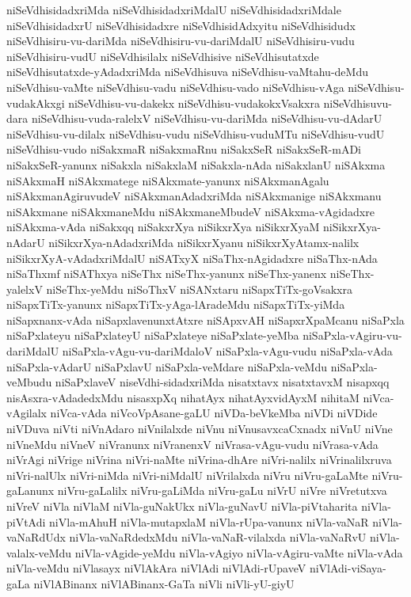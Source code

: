 {niSeVdhisidadxriMda
niSeVdhisidadxriMdalU
niSeVdhisidadxriMdale
niSeVdhisidadxrU
niSeVdhisidadxre
niSeVdhisidAdxyitu
niSeVdhisidudx
niSeVdhisiru-vu-dariMda
niSeVdhisiru-vu-dariMdalU
niSeVdhisiru-vudu
niSeVdhisiru-vudU
niSeVdhisilalx
niSeVdhisive
niSeVdhisutatxde
niSeVdhisutatxde-yAdadxriMda
niSeVdhisuva
niSeVdhisu-vaMtahu-deMdu
niSeVdhisu-vaMte
niSeVdhisu-vadu
niSeVdhisu-vado
niSeVdhisu-vAga
niSeVdhisu-vudakAkxgi
niSeVdhisu-vu-dakekx
niSeVdhisu-vudakokxVsakxra
niSeVdhisuvu-dara
niSeVdhisu-vuda-ralelxV
niSeVdhisu-vu-dariMda
niSeVdhisu-vu-dAdarU
niSeVdhisu-vu-dilalx
niSeVdhisu-vudu
niSeVdhisu-vuduMTu
niSeVdhisu-vudU
niSeVdhisu-vudo
niSakxmaR
niSakxmaRnu
niSakxSeR
niSakxSeR-mADi
niSakxSeR-yanunx
niSakxla
niSakxlaM
niSakxla-nAda
niSakxlanU
niSAkxma
niSAkxmaH
niSAkxmatege
niSAkxmate-yanunx
niSAkxmanAgalu
niSAkxmanAgiruvudeV
niSAkxmanAdadxriMda
niSAkxmanige
niSAkxmanu
niSAkxmane
niSAkxmaneMdu
niSAkxmaneMbudeV
niSAkxma-vAgidadxre
niSAkxma-vAda
niSakxqq
niSakxrXya
niSikxrXya
niSikxrXyaM
niSikxrXya-nAdarU
niSikxrXya-nAdadxriMda
niSikxrXyanu
niSikxrXyAtamx-nalilx
niSikxrXyA-vAdadxriMdalU
niSATxyX
niSaThx-nAgidadxre
niSaThx-nAda
niSaThxmf
niSAThxya
niSeThx
niSeThx-yanunx
niSeThx-yanenx
niSeThx-yalelxV
niSeThx-yeMdu
niSoThxV
niSANxtaru
niSapxTiTx-goVsakxra
niSapxTiTx-yanunx
niSapxTiTx-yAga-lAradeMdu
niSapxTiTx-yiMda
niSapxnanx-vAda
niSapxlavenunxtAtxre
niSApxvAH
niSapxrXpaMcanu
niSaPxla
niSaPxlateyu
niSaPxlateyU
niSaPxlateye
niSaPxlate-yeMba
niSaPxla-vAgiru-vu-dariMdalU
niSaPxla-vAgu-vu-dariMdaloV
niSaPxla-vAgu-vudu
niSaPxla-vAda
niSaPxla-vAdarU
niSaPxlavU
niSaPxla-veMdare
niSaPxla-veMdu
niSaPxla-veMbudu
niSaPxlaveV
niseVdhi-sidadxriMda
nisatxtavx
nisatxtavxM
nisapxqq
nisAsxra-vAdadedxMdu
nisasxpXq
nihatAyx
nihatAyxvidAyxM
nihitaM
niVca-vAgilalx
niVca-vAda
niVcoVpAsane-gaLU
niVDa-beVkeMba
niVDi
niVDide
niVDuva
niVti
niVnAdaro
niVnilalxde
niVnu
niVnusavxcaCxnadx
niVnU
niVne
niVneMdu
niVneV
niVranunx
niVranenxV
niVrasa-vAgu-vudu
niVrasa-vAda
niVrAgi
niVrige
niVrina
niVri-naMte
niVrina-dhAre
niVri-nalilx
niVrinalilxruva
niVri-nalUlx
niVri-niMda
niVri-niMdalU
niVrilalxda
niVru
niVru-gaLaMte
niVru-gaLanunx
niVru-gaLalilx
niVru-gaLiMda
niVru-gaLu
niVrU
niVre
niVretutxva
niVreV
niVla
niVlaM
niVla-guNakUkx
niVla-guNavU
niVla-piVtaharita
niVla-piVtAdi
niVla-mAhuH
niVla-mutapxlaM
niVla-rUpa-vanunx
niVla-vaNaR
niVla-vaNaRdUdx
niVla-vaNaRdedxMdu
niVla-vaNaR-vilalxda
niVla-vaNaRvU
niVla-valalx-veMdu
niVla-vAgide-yeMdu
niVla-vAgiyo
niVla-vAgiru-vaMte
niVla-vAda
niVla-veMdu
niVlasayx
niVlAkAra
niVlAdi
niVlAdi-rUpaveV
niVlAdi-viSaya-gaLa
niVlABinanx
niVlABinanx-GaTa
niVli
niVli-yU-giyU
}
